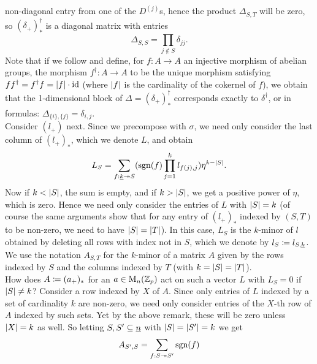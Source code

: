 \begin{rem}
    non-diagonal entry from one of the $D^{(j)}$s, hence the product
    $\Delta_{S,T}$ will be zero, so $(\delta_+)^\dagger_*$ is a diagonal matrix
    with entries
    \begin{equation}\label{eq_dagger_of_diagnoal_plus}
      \Delta_{S,S} = \prod_{j \notin S} \delta_{jj}.
    \end{equation}
    Note that if we follow \cite[Def. 3.7]{carlsson2011higher} and define, for
    $f:A \to A$ an injective morphism of abelian groups, the morphism
    $f^\dagger: A \to A$ to be the unique morphism satisfying $f f^\dagger =
    f^\dagger f = \left\vert f\right\vert \cdot \operatorname{id}$ (where $\left\vert f\right\vert$ is the cardinality of the
    cokernel of $f$), we obtain that the 1-dimensional block of $\Delta =
    (\delta_+)^\dagger_*$ corresponds exactly to $\delta^\dagger$, or in
    formulas: $\Delta_{\{i\},\{j\}} = \delta_{i,j}$.\\
    Consider $(l_+)$ next. Since we precompose with $\sigma$, we need only
    consider the last column of $(l_+)_*$, which we denote $L$, and obtain
    \begin{displaymath}
      L_S = \sum_{f:\ind{k} \onto S} %
        (\sgn(f) \prod_{j=1}^k l_{f(j),j}) \eta^{k - \abs{S}}.
    \end{displaymath}
    Now if $k < \left\vert S\right\vert$, the sum is empty, and if $k > \left\vert S\right\vert$, we get a
    positive power of $\eta$, which is zero. Hence we need only consider the
    entries of $L$ with $\left\vert S\right\vert = k$ (of course the same arguments show that
    for any entry of $(l_+)_*$ indexed by $(S,T)$ to be non-zero, we need to
    have $\left\vert S\right\vert = \left\vert T\right\vert$). In this case, $L_S$ is the $k$-minor of $l$
    obtained by deleting all rows with index not in $S$, which we denote by $l_S
    \coloneqq l_{S,\underline{k}}$. We use the notation $A_{S,T}$ for the $k$-minor of a
    matrix $A$ given by the rows indexed by $S$ and the columns indexed by $T$
    (with $k=\left\vert S\right\vert=\left\vert T\right\vert$).\\
    How does $A \coloneqq (a_+)_*$ for an $a \in \mathrm{M}_n(\mathbb{Z}_p)$ act on such a vector
    $L$ with $L_S = 0$ if $\left\vert S\right\vert \neq k$? Consider a row indexed by $X$ of
    $A$. Since only entries of $L$ indexed by a set of cardinality $k$ are
    non-zero, we need only consider entries of the $X$-th row of $A$ indexed by
    such sets. Yet by the above remark, these will be zero unless $\left\vert X\right\vert = k$
    as well. So letting $S, S^\prime \subseteq \underline{n}$ with $\left\vert S\right\vert =
    \left\vert S^\prime\right\vert = k$ we get
    \begin{displaymath}
      A_{S^\prime,S} = \sum_{f:S \onto S^\prime} \sgn(f) %

\end{displaymath}
\end{rem}
